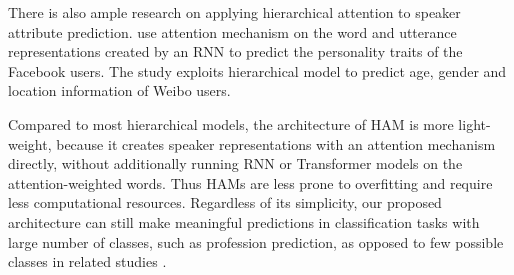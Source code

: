 There is also ample research on applying hierarchical attention to speaker attribute prediction. \citet{lynn2020hierarchical} use attention mechanism on the word and utterance representations created by an RNN to predict the personality traits of the Facebook users. The study \cite{li2019improving} exploits hierarchical model to predict age, gender and location information of Weibo users.

Compared to most hierarchical models, the architecture of HAM is more light\hyp{}weight, because it creates speaker representations with an attention mechanism directly, without additionally running RNN or Transformer models on the attention-weighted words. Thus HAMs are less prone to overfitting and require less computational resources. Regardless of its simplicity, our proposed architecture can still make meaningful predictions in classification tasks with large number of classes, such as profession prediction, as opposed to few possible classes in related studies \cite{lynn2020hierarchical, li2019improving}. 



 



